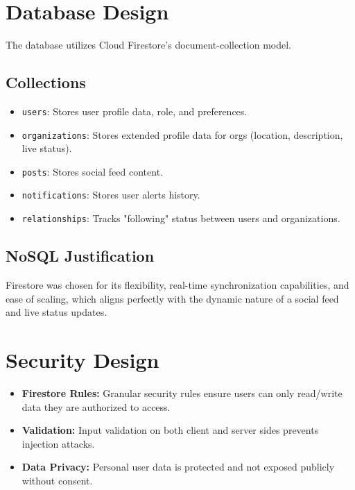 \documentclass[12pt, a4paper]{report}
\begin{document}
\chapter{Database Design}
The database utilizes Cloud Firestore's document-collection model.

\section{Collections}
\begin{itemize}
    \item \texttt{users}: Stores user profile data, role, and preferences.
    \item \texttt{organizations}: Stores extended profile data for orgs (location, description, live status).
    \item \texttt{posts}: Stores social feed content.
    \item \texttt{notifications}: Stores user alerts history.
    \item \texttt{relationships}: Tracks "following" status between users and organizations.
\end{itemize}

\section{NoSQL Justification}
Firestore was chosen for its flexibility, real-time synchronization capabilities, and ease of scaling, which aligns perfectly with the dynamic nature of a social feed and live status updates.

\chapter{Security Design}
\begin{itemize}
    \item \textbf{Firestore Rules:} Granular security rules ensure users can only read/write data they are authorized to access.
    \item \textbf{Validation:} Input validation on both client and server sides prevents injection attacks.
    \item \textbf{Data Privacy:} Personal user data is protected and not exposed publicly without consent.
\end{itemize}
\end{document}
